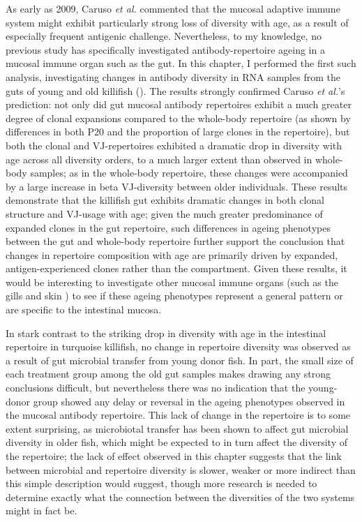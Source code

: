 As early as 2009, Caruso \textit{et al.} \parencite{caruso2009immunosenescence} commented that the mucosal adaptive immune system might exhibit particularly strong loss of diversity with age, as a result of especially frequent antigenic challenge. Nevertheless, to my knowledge, no previous study has specifically investigated antibody-repertoire ageing in a mucosal immune organ such as the gut. In this chapter, I performed the first such analysis, investigating changes in antibody diversity in RNA samples from the guts of young and old killifish (). The results strongly confirmed Caruso \textit{et al.}'s prediction: not only did gut mucosal antibody repertoires exhibit a much greater degree of clonal expansions compared to the whole-body repertoire (as shown by differences in both P20 and the proportion of large clones in the repertoire), but both the clonal and VJ-repertoires exhibited a dramatic drop in diversity with age across all diversity orders, to a much larger extent than observed in whole-body samples; as in the whole-body repertoire, these changes were accompanied by a large increase in beta VJ-diversity between older individuals. These results demonstrate that the killifish gut exhibits dramatic changes in both clonal structure and VJ-usage with age; given the much greater predominance of expanded clones in the gut repertoire, such differences in ageing phenotypes between the gut and whole-body repertoire further support the conclusion that changes in repertoire composition with age are primarily driven by expanded, antigen-experienced clones rather than the \naive compartment. Given these results, it would be interesting to investigate other mucosal immune organs (such as the gills and skin \parencite{xu2013igtskin}) to see if these ageing phenotypes represent a general pattern or are specific to the intestinal mucosa.

In stark contrast to the striking drop in diversity with age in the intestinal repertoire in turquoise killifish, no change in repertoire diversity was observed as a result of gut microbial transfer from young donor fish. In part, the small size of each treatment group among the old gut samples makes drawing any strong conclusions difficult, but nevertheless there was no indication that the young-donor group showed any delay or reversal in the ageing phenotypes observed in the mucosal antibody repertoire. This lack of change in the repertoire is to some extent surprising, as microbiotal transfer has been shown to affect gut microbial diversity in older fish, which might be expected to in turn affect the diversity of the repertoire; the lack of effect observed in this chapter suggests that the link between microbial and repertoire diversity is slower, weaker or more indirect than this simple description would suggest, though more research is needed to determine exactly what the connection between the diversities of the two systems might in fact be. 

